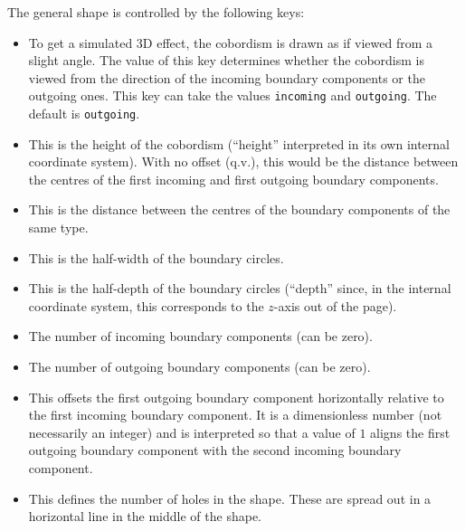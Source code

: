 \documentclass{ltxdoc}
\begin{document}
The general shape is controlled by the following keys:

\begin{itemize}
\item {} To get a simulated 3D effect, the cobordism is drawn as if viewed from a slight angle.
The value of this key determines whether the cobordism is viewed from the direction of the incoming boundary components or the outgoing ones.
This key can take the values \Verb+incoming+ and \Verb+outgoing+.
The default is \Verb+outgoing+.
\item {} This is the height of the cobordism (``height'' interpreted in its own internal coordinate system).
With no offset (q.v.), this would be the distance between the centres of the first incoming and first outgoing boundary components.

\item {} This is the distance between the centres of the boundary components of the same type.

\item {} This is the half-width of the boundary circles.

\item {} This is the half-depth of the boundary circles (``depth'' since, in the internal coordinate system, this corresponds to the \(z\)-axis out of the page).

\item {} The number of incoming boundary components (can be zero).

\item {} The number of outgoing boundary components (can be zero).

\item {} This offsets the first outgoing boundary component horizontally relative to the first incoming boundary component.
It is a dimensionless number (not necessarily an integer) and is interpreted so that a value of \(1\) aligns the first outgoing boundary component with the second incoming boundary component.

\item {} This defines the number of holes in the shape.
These are spread out in a horizontal line in the middle of the shape.
\end{itemize}
\end{document}
